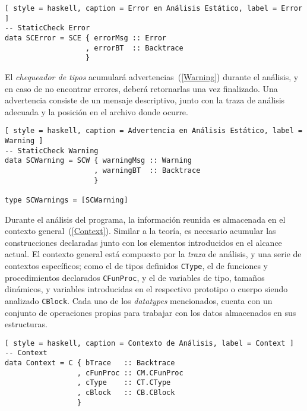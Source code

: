 \begin{lstlisting}[ style = haskell, caption = Error en Análisis Estático, label = Error ]
-- StaticCheck Error
data SCError = SCE { errorMsg :: Error
                   , errorBT  :: Backtrace
                   }
\end{lstlisting}

El \textit{chequeador de tipos} acumulará advertencias~(\ref{Warning}) durante el análisis, y en caso de no encontrar errores, deberá retornarlas una vez finalizado.
Una advertencia consiste de un mensaje descriptivo, junto con la traza de análisis adecuada y la posición en el archivo donde ocurre.

\begin{lstlisting}[ style = haskell, caption = Advertencia en Análisis Estático, label = Warning ]
-- StaticCheck Warning
data SCWarning = SCW { warningMsg :: Warning
                     , warningBT  :: Backtrace
                     }

type SCWarnings = [SCWarning]
\end{lstlisting}


Durante el análisis del programa, la información reunida es almacenada en el contexto general~(\ref{Context}).
Similar a la teoría, es necesario acumular las construcciones declaradas junto con los elementos introducidos en el alcance actual.
El contexto general está compuesto por la \textit{traza} de análisis, y una serie de contextos específicos; como el de tipos definidos \lstinline[style = haskell]{CType}, el de funciones y procedimientos declarados \lstinline[style = haskell]{CFunProc}, y el de variables de tipo, tamaños dinámicos, y variables introducidas en el respectivo prototipo o cuerpo siendo analizado \lstinline[style = haskell]{CBlock}.
Cada uno de los \textit{datatypes} mencionados, cuenta con un conjunto de operaciones propias para trabajar con los datos almacenados en sus estructuras.

\begin{lstlisting}[ style = haskell, caption = Contexto de Análisis, label = Context ]
-- Context
data Context = C { bTrace   :: Backtrace
                 , cFunProc :: CM.CFunProc
                 , cType    :: CT.CType
                 , cBlock   :: CB.CBlock
                 }
\end{lstlisting}


